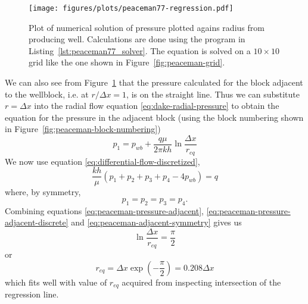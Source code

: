 \begin{figure}[htbp]
    \centering
    \texttt{[image: figures/plots/peaceman77-regression.pdf]}
    \caption{Plot of numerical solution of pressure plotted agains radius from producing well. Calculations are done using the program in Listing~\ref{lst:peaceman77_solver}. The equation is solved on a $10\times 10$ grid like the one shown in Figure~\ref{fig:peaceman-grid}.}
    \label{fig:peaceman77_pressure_vs_radius}
\end{figure}

We can also see from Figure~\ref{fig:peaceman77_pressure_vs_radius} that the pressure calculated for the block adjacent to the wellblock, i.e. at $r/\Delta x=1$, is on the straight line. Thus we can substitute $r=\Delta x$ into the radial flow equation \eqref{eq:dake-radial-pressure} to obtain the equation for the pressure in the adjacent block (using the block numbering shown in Figure~\ref{fig:peaceman-block-numbering})
\begin{equation}
    \label{eq:peaceman-pressure-adjacent}
    p_1 = p_{wb} + \frac{q\mu}{2\pi kh} \ln{\frac{\Delta x}{r_{eq}}}
\end{equation}
We now use equation \eqref{eq:differential-flow-discretized},
\begin{equation}
    \label{eq:peaceman-pressure-adjacent-discrete}
    \frac{kh}{\mu} \left( p_1 + p_2 + p_3 + p_4 -4p_{wb}  \right) = q
\end{equation}
where, by symmetry,
\begin{equation}
    \label{eq:peaceman-adjacent-symmetry}
    p_1=p_2=p_3=p_4.
\end{equation}
Combining equations \eqref{eq:peaceman-pressure-adjacent}, \eqref{eq:peaceman-pressure-adjacent-discrete} and \eqref{eq:peaceman-adjacent-symmetry} gives us
\begin{equation}
    \ln{\frac{\Delta x}{r_{eq}}} = \frac{\pi}{2}
\end{equation}
or
\begin{equation}
    r_{eq} = \Delta x \exp{\left( -\frac{\pi}{2} \right)} = 0.208 \Delta x
\end{equation}
which fits well with value of $r_{eq}$ acquired from inspecting intersection of the regression line.



